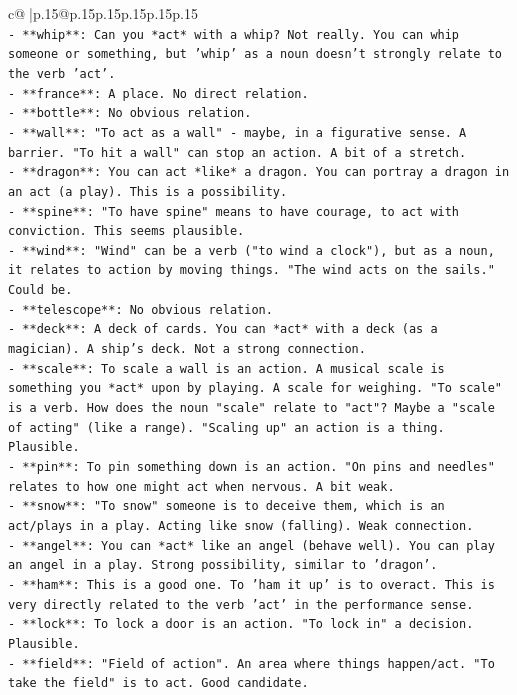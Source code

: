 \documentclass{article}
\begin{document}
{\begin{supertabular}{c@{$\;$}|p{.15\linewidth}@{}p{.15\linewidth}p{.15\linewidth}p{.15\linewidth}p{.15\linewidth}p{.15\linewidth}}
{{{\\ 
\texttt{{-} **whip**: Can you *act* with a whip? Not really. You can whip someone or something, but 'whip' as a noun doesn't strongly relate to the verb 'act'.} \\
\texttt{{-} **france**: A place. No direct relation.} \\
\texttt{{-} **bottle**: No obvious relation.} \\
\texttt{{-} **wall**: "To act as a wall" {-} maybe, in a figurative sense. A barrier. "To hit a wall" can stop an action. A bit of a stretch.} \\
\texttt{{-} **dragon**: You can act *like* a dragon. You can portray a dragon in an act (a play). This is a possibility.} \\
\texttt{{-} **spine**: "To have spine" means to have courage, to act with conviction. This seems plausible.} \\
\texttt{{-} **wind**: "Wind" can be a verb ("to wind a clock"), but as a noun, it relates to action by moving things. "The wind acts on the sails." Could be.} \\
\texttt{{-} **telescope**: No obvious relation.} \\
\texttt{{-} **deck**: A deck of cards. You can *act* with a deck (as a magician). A ship's deck. Not a strong connection.} \\
\texttt{{-} **scale**: To scale a wall is an action. A musical scale is something you *act* upon by playing. A scale for weighing. "To scale" is a verb. How does the noun "scale" relate to "act"? Maybe a "scale of acting" (like a range). "Scaling up" an action is a thing. Plausible.} \\
\texttt{{-} **pin**: To pin something down is an action. "On pins and needles" relates to how one might act when nervous. A bit weak.} \\
\texttt{{-} **snow**: "To snow" someone is to deceive them, which is an act/plays in a play. Acting like snow (falling). Weak connection.} \\
\texttt{{-} **angel**: You can *act* like an angel (behave well). You can play an angel in a play. Strong possibility, similar to 'dragon'.} \\
\texttt{{-} **ham**: This is a good one. To 'ham it up' is to overact. This is very directly related to the verb 'act' in the performance sense.} \\
\texttt{{-} **lock**: To lock a door is an action. "To lock in" a decision. Plausible.} \\
\texttt{{-} **field**: "Field of action". An area where things happen/act. "To take the field" is to act. Good candidate.} \\
}}}
\end{supertabular}}
\end{document}
